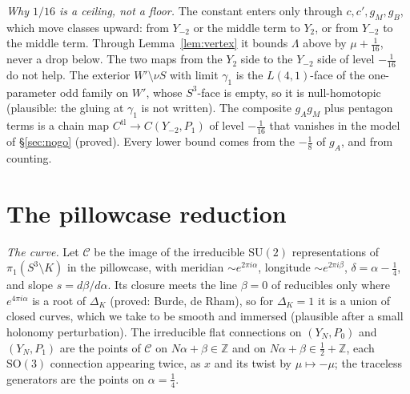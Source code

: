\documentclass[10pt]{amsart}
\numberwithin{equation}{section}
\theoremstyle{compact}
\theoremstyle{definition}
\newcommand{\Z}{\mathbb Z}
\newcommand{\SO}{\mathrm{SO}}
\newcommand{\SU}{\mathrm{SU}}
\newcommand{\tl}{\mathrm{tl}}
\newcommand{\cC}{\mathcal C}
\newcommand{\st}[1]{\par\noindent\textit{#1}\enspace}
\begin{document}
\st{Why $1/16$ is a ceiling, not a floor.} The constant enters only through
$c,c',g_M,g_B$, which move classes upward: from $Y_{-2}$ or the middle term
to $Y_2$, or from $Y_{-2}$ to the middle term. Through
Lemma~\ref{lem:vertex} it bounds $\Lambda$ above by $\mu+\frac1{16}$, never
a drop below. The two maps from the $Y_2$ side to the $Y_{-2}$ side of level
$-\frac1{16}$ do not help. The exterior $W'\setminus\nu S$ with limit
$\gamma_1$ is the $L(4,1)$-face of the one-parameter odd family on $W'$,
whose $S^3$-face is empty, so it is null-homotopic (plausible: the gluing
at $\gamma_1$ is not written). The composite $g_Ag_M$ plus pentagon terms is
a chain map $C^\tl\to C(Y_{-2},P_1)$ of level $-\frac1{16}$ that vanishes in
the model of \S\ref{sec:nogo} (proved). Every lower bound comes from the
$-\frac18$ of $g_A$, and from counting.

\section{The pillowcase reduction}\label{sec:pillow}

\st{The curve.} Let $\cC$ be the image of the irreducible $\SU(2)$
representations of $\pi_1(S^3\setminus K)$ in the pillowcase, with
meridian $\sim e^{2\pi i\alpha}$, longitude $\sim e^{2\pi i\beta}$,
$\delta=\alpha-\frac14$, and slope $s=d\beta/d\alpha$. Its closure meets the
line $\beta=0$ of reducibles only where $e^{4\pi i\alpha}$ is a root of
$\Delta_K$ (proved: Burde, de Rham), so for $\Delta_K=1$ it is a union of closed curves, which we
take to be smooth and immersed (plausible after a small holonomy
perturbation).
The irreducible flat connections on $(Y_N,P_0)$ and $(Y_N,P_1)$ are the
points of $\cC$ on $N\alpha+\beta\in\Z$ and on $N\alpha+\beta\in\frac12+\Z$,
each $\SO(3)$ connection appearing twice, as $x$ and its twist by
$\mu\mapsto-\mu$; the traceless generators are the points on
$\alpha=\frac14$.
\end{document}
